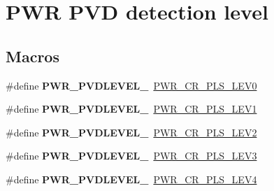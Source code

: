 \hypertarget{group___p_w_r___p_v_d__detection__level}{}\section{P\+WR P\+VD detection level}
\label{group___p_w_r___p_v_d__detection__level}
\subsection*{Macros}
\begin{DoxyCompactItemize}
\item 
\#define {\bfseries P\+W\+R\+\_\+\+P\+V\+D\+L\+E\+V\+E\+L\+\_}~\hyperlink{group___peripheral___registers___bits___definition_gacb6b904b20d7e4fff958c75748861216}{P\+W\+R\+\_\+\+C\+R\+\_\+\+P\+L\+S\+\_\+\+L\+E\+V0}\hypertarget{group___p_w_r___p_v_d__detection__level_gaddf4616a143ac3481f3043f2a4c21c18}{}\label{group___p_w_r___p_v_d__detection__level_gaddf4616a143ac3481f3043f2a4c21c18}

\item 
\#define {\bfseries P\+W\+R\+\_\+\+P\+V\+D\+L\+E\+V\+E\+L\+\_}~\hyperlink{group___peripheral___registers___bits___definition_ga15b71263f73f0c4e53ca91fc8d096818}{P\+W\+R\+\_\+\+C\+R\+\_\+\+P\+L\+S\+\_\+\+L\+E\+V1}\hypertarget{group___p_w_r___p_v_d__detection__level_ga06e55b20a8777594f1a91ee71fac1f79}{}\label{group___p_w_r___p_v_d__detection__level_ga06e55b20a8777594f1a91ee71fac1f79}

\item 
\#define {\bfseries P\+W\+R\+\_\+\+P\+V\+D\+L\+E\+V\+E\+L\+\_}~\hyperlink{group___peripheral___registers___bits___definition_ga2ea128abc2fc4252b53d09ca2850e69e}{P\+W\+R\+\_\+\+C\+R\+\_\+\+P\+L\+S\+\_\+\+L\+E\+V2}\hypertarget{group___p_w_r___p_v_d__detection__level_gab26bb78650bbaef26ac9f9123c791cc7}{}\label{group___p_w_r___p_v_d__detection__level_gab26bb78650bbaef26ac9f9123c791cc7}

\item 
\#define {\bfseries P\+W\+R\+\_\+\+P\+V\+D\+L\+E\+V\+E\+L\+\_}~\hyperlink{group___peripheral___registers___bits___definition_ga9c1782980a2fb12de80058729a74f174}{P\+W\+R\+\_\+\+C\+R\+\_\+\+P\+L\+S\+\_\+\+L\+E\+V3}\hypertarget{group___p_w_r___p_v_d__detection__level_ga7b751743b3e29c237e6a0e1d7bdd0503}{}\label{group___p_w_r___p_v_d__detection__level_ga7b751743b3e29c237e6a0e1d7bdd0503}

\item 
\#define {\bfseries P\+W\+R\+\_\+\+P\+V\+D\+L\+E\+V\+E\+L\+\_}~\hyperlink{group___peripheral___registers___bits___definition_ga0fe79f097ea6c30a4ccf69ed3e177f85}{P\+W\+R\+\_\+\+C\+R\+\_\+\+P\+L\+S\+\_\+\+L\+E\+V4}\hypertarget{group___p_w_r___p_v_d__detection__level_ga03c0d3ae547deb1a51b8acafac101698}{}\label{group___p_w_r___p_v_d__detection__level_ga03c0d3ae547deb1a51b8acafac101698}


\end{DoxyCompactItemize}
